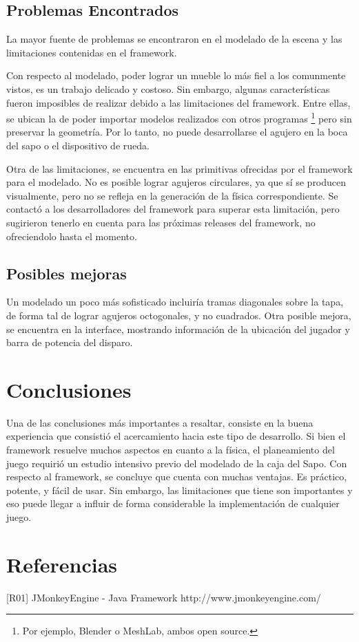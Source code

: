 \documentclass{acm_proc_article-sp}
\begin{document}
\subsection{Problemas Encontrados}

La mayor fuente de problemas se encontraron en el modelado de la escena y las limitaciones contenidas en el framework.

Con respecto al modelado, poder lograr un mueble lo m\'as fiel a los comunmente vistos, es un trabajo delicado y costoso. Sin embargo, algunas caracter\'isticas fueron imposibles de realizar debido a las limitaciones del framework. Entre ellas, se ubican la de poder importar modelos realizados con otros programas \footnote{Por ejemplo, Blender o MeshLab, ambos open source.} pero sin preservar la geometr\'ia. Por lo tanto, no puede desarrollarse el agujero en la boca del sapo o el dispositivo de rueda. 

Otra de las limitaciones, se encuentra en las primitivas ofrecidas por el framework para el modelado. No es posible lograr agujeros circulares, ya que s\'i se producen visualmente, pero no se refleja en la generaci\'on de la f\'isica correspondiente. Se contact\'o a los desarrolladores del framework para superar esta limitaci\'on, pero sugirieron tenerlo en cuenta para las pr\'oximas releases del framework, no ofreciendolo hasta el momento.

\subsection{Posibles mejoras}

Un modelado un poco m\'as sofisticado incluir\'ia tramas diagonales sobre la tapa, de forma tal de lograr agujeros octogonales, y no cuadrados. 
Otra posible mejora, se encuentra en la interface, mostrando informaci\'on de la ubicaci\'on del jugador y barra de potencia del disparo.

\section{Conclusiones}
Una de las conclusiones m\'as importantes a resaltar, consiste en la buena experiencia que consisti\'o el acercamiento hacia este tipo de desarrollo. Si bien el framework resuelve muchos aspectos en cuanto a la f\'isica, el planeamiento del juego requiri\'o un estudio intensivo previo del modelado de la caja del Sapo. 
Con respecto al framework, se concluye que cuenta con muchas ventajas. Es pr\'actico, potente, y f\'acil de usar. Sin embargo, las limitaciones que tiene son importantes y eso puede llegar a influir de forma considerable la implementaci\'on de cualquier juego. 



\section*{Referencias}

[R01] JMonkeyEngine - Java Framework http://www.jmonkeyengine.com/


\end{document}
